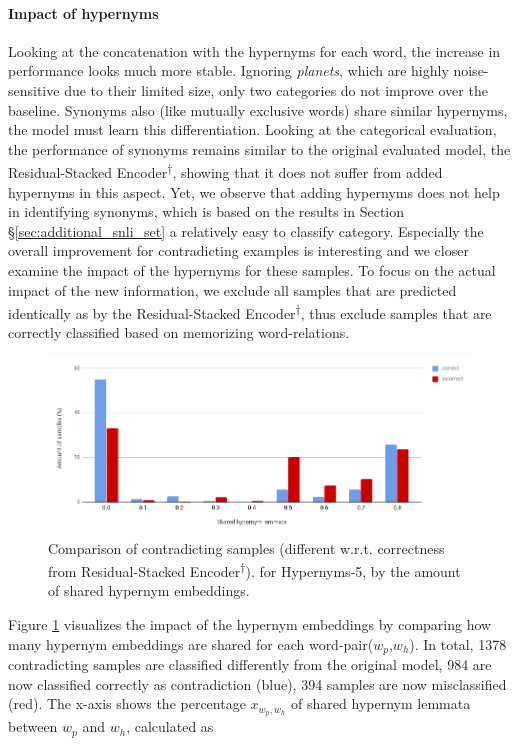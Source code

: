 \paragraph*{Impact of hypernyms}
Looking at the concatenation with the hypernyms for each word, the increase in performance looks much more stable. Ignoring \textit{planets}, which are highly noise-sensitive due to their limited size, only two categories do not improve over the baseline. Synonyms also (like mutually exclusive words) share similar hypernyms, the model must learn this differentiation. Looking at the categorical evaluation, the performance of synonyms remains similar to the original evaluated model, the Residual-Stacked Encoder\textsuperscript{$\dagger$}, showing that it does not suffer from added hypernyms in this aspect. Yet, we observe that adding hypernyms does not help in identifying synonyms, which is based on the results in Section §\ref{sec:additional_snli_set} a relatively easy to classify category. Especially the overall improvement for contradicting examples is interesting and we closer examine the impact of the hypernyms for these samples. To focus on the actual impact of the new information, we exclude all samples that are predicted identically as by the Residual-Stacked Encoder\textsuperscript{$\dagger$}, thus exclude samples that are correctly classified based on memorizing word-relations. 
\begin{figure}[tph!]
\centering
	\includegraphics[totalheight=5.5cm]{fig/analyse_hypern5.png}
	\caption{Comparison of contradicting samples (different w.r.t. correctness from Residual-Stacked Encoder\textsuperscript{$\dagger$}). for Hypernyms-5, by the amount of shared hypernym embeddings.}
	\label{fig:analyse_hypern5}
\end{figure}
Figure \ref{fig:analyse_hypern5} visualizes the impact of the hypernym embeddings by comparing how many hypernym embeddings are shared for each word-pair($w_p$,$w_h$). In total, 1378 contradicting samples are classified differently from the original model, 984 are now classified correctly as contradiction (blue), 394 samples are now misclassified (red). The x-axis shows the percentage $x_{w_p,w_h}$ of shared hypernym lemmata between $w_p$ and $w_h$, calculated as 
